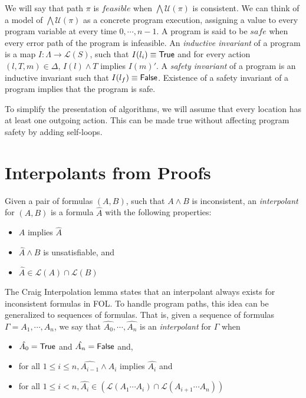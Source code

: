 We will say that path $\pi$ is $feasible$ when $\bigwedge \mathcal{U}(\pi)$ is consistent.
We can think of a model of $\bigwedge \mathcal{U}(\pi)$ as a concrete program execution,
assigning a value to every program variable at every time $0, \cdots, n-1$. A program is
said to be $safe$ when every error path of the program is infeasible. An
\textit{inductive invariant} of a program is a map
$I : \Lambda \rightarrow \mathcal{L}(S)$, such that $I(l_i) \equiv \mathsf{True}$ and for every
action $(l, T, m) \in \Delta$, $I(l) \wedge T$ implies $I(m)'$. A \textit{safety invariant}
of a program is an inductive invariant such that $I(l_f) \equiv \mathsf{False}$. Existence of a
safety invariant of a program implies that the program is safe.

To simplify the presentation of algorithms, we will assume that every location has at
least one outgoing action. This can be made true without affecting program safety by
adding self-loops.

\section{Interpolants from Proofs}
\label{sec:interpolants-from-proofs}

Given a pair of formulas $(A,B)$, such that $A \wedge B$ is inconsistent, an
\textit{interpolant} for $(A,B)$ is a formula $\hat{A}$ with the following properties:

\begin{itemize}
  \item $A$ implies $\hat{A}$
  \item $\hat{A} \wedge B$ is unsatisfiable, and
  \item $\hat{A} \in \mathcal{L}(A) \cap \mathcal{L}(B)$
\end{itemize}

The Craig Interpolation lemma \cite{craig1957} states that an interpolant always exists
for inconsistent formulas in FOL. To handle program paths, this idea can be generalized to
sequences of formulas. That is, given a sequence of formulas
$\Gamma = A_1, \cdots , A_n$, we say that $\hat{A_0},\cdots, \hat{A_n}$ is an
\textit{interpolant} for $\Gamma$ when

\begin{itemize}
  \item $\hat{A_0} = \mathsf{True}$ and $\hat{A_n} = \mathsf{False}$ and,
  \item for all $1 \leq i \leq n, \hat{A_{i-1}} \wedge A_i$ implies $\hat{A_i}$ and
  \item for all $1 \leq i < n, \hat{A_i} \in (\mathcal{L}(A_1 \cdots A_i) \cap \mathcal{L}(A_{i+1}\cdots A_n))$
\end{itemize}

